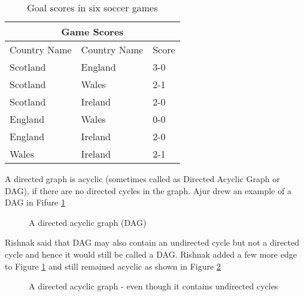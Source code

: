 \begin{table}
\begin{center}
\begin{tabular}{ |p{3cm}||p{3cm}||p{1.5cm} || }
 \hline
 \multicolumn{3}{|c|}{Game Scores} \\
 \hline
 Country Name & Country Name &Score\\
 \hline
 Scotland  & England    &3-0\\
 Scotland& Wales&2-1\\
 Scotland&Ireland&2-0\\
 England&Wales&0-0\\
 England&Ireland &2-0\\
 Wales&Ireland&2-1\\
 
 
 \hline
\end{tabular}
\caption{Goal scores in six soccer games}\label{14t3}
\end{center}
\end{table}
A directed graph is acyclic (sometimes called as Directed Acyclic Graph or DAG), if there are no directed cycles in the graph. Ajur drew an example of a DAG in Fifure \ref{15g5}

\begin{figure}
\begin{center}
\caption{ A directed acyclic graph (DAG)}\label{15g5}
\end{center}
\end{figure}

Rishnak said that DAG may also contain an undirected cycle but not a directed cycle and hence it would still be called a DAG. Rishnak added a few more edge to Figure \ref{15g5} and still remained acyclic as shown in Figure \ref{15g6}

\begin{figure}
\begin{center}
\caption{ A directed acyclic graph - even though it contains undirected cycles }\label{15g6}
\end{center}
\end{figure}

